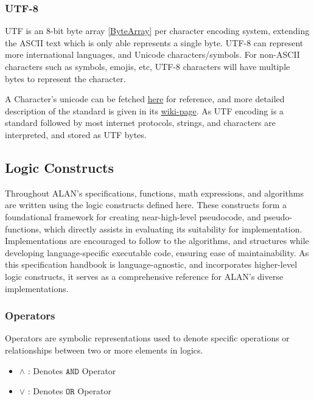 \documentclass[../alan-handbook.tex]{subfiles}
\begin{document}
\subsubsection{UTF-8} \label{UTF-8}

UTF is an 8-bit byte array \ref{ByteArray} per character encoding system, extending the ASCII text which is only able represents a single byte. UTF-8 can represent more international languages, and Unicode characters/symbols. For non-ASCII characters such as symbols, emojis, etc, UTF-8 characters will have multiple bytes to represent the character.

A Character's unicode can be fetched \href{https://www.charset.org/utf-8}{here} for reference, and more detailed description of the standard is given in its \href{https://en.wikipedia.org/wiki/UTF-8}{wiki-page}. As UTF encoding is a standard followed by most internet protocols, strings, and characters are interpreted, and stored as UTF bytes.

\subsection{Logic Constructs} \label{LogicConstructs}

Throughout ALAN's specifications, functions, math expressions, and algorithms are written using the logic constructs defined here. These constructs form a foundational framework for creating near-high-level pseudocode, and pseudo-functions, which directly assists in evaluating its suitability for implementation. Implementations are encouraged to follow to the algorithms, and structures while developing language-specific executable code, ensuring ease of maintainability. As this specification handbook is language-agnostic, and incorporates higher-level logic constructs, it serves as a comprehensive reference for ALAN's diverse implementations.

\subsubsection{Operators} \label{Operators}

Operators are symbolic representations used to denote specific operations or relationships between two or more elements in logics. 

\begin{itemize}
    \item $\wedge$ : Denotes $\texttt{AND}$ Operator 
    \item $\vee$ : Denotes $\texttt{OR}$ Operator
\end{itemize}
\end{document}
